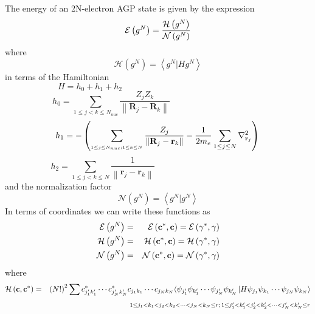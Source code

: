 \documentclass{article}
\begin{document}
The energy of an 2N-electron AGP state is given by the expression 
\begin{equation}
\mathcal{E}\left( g^{N}\right) =\frac{\mathcal{H}\left( g^{N}\right) }{%
\mathcal{N}\left( g^{N}\right) }  \label{Energy}
\end{equation}%
where%
\begin{equation*}
\mathcal{H}\left( g^{N}\right) =\left\langle g^{N}|Hg^{N}\right\rangle
\end{equation*}%
in terms of the Hamiltonian%
\begin{equation*}
H=h_{0}+h_{1}+h_{2}\qquad \qquad \qquad \qquad \qquad \qquad \qquad \qquad
\end{equation*}%
\begin{equation*}
h_{0}=\sum_{1\leq j<k\leq N_{nuc}}\frac{Z_{j}Z_{k}}{\left\| \mathbf{R}_{j}-%
\mathbf{R}_{k}\right\| }\qquad \qquad \qquad \qquad \qquad \quad
\end{equation*}%
\begin{equation*}
h_{1}=-\left( \sum_{_{1\leq j\leq N_{nuc};1\leq k\leq N}}\frac{Z_{j}}{%
\left\| \mathbf{R}_{j}-\mathbf{r}_{k}\right\| }-\frac{1}{2m_{e}}\sum_{1\leq
j\leq N}\nabla _{\mathbf{r}_{j}}^{2}\right) \,
\end{equation*}%
\begin{equation}
h_{2}=\sum_{1\leq j<k\leq N}\frac{1}{\left\| \mathbf{r}_{j}-\mathbf{r}%
_{k}\right\| }\qquad \qquad \qquad \qquad \qquad \qquad \quad
\end{equation}%
and the normalization factor 
\begin{equation}
\mathcal{N}\left( g^{N}\right) =\left\langle g^{N}|g^{N}\right\rangle
\end{equation}%
In terms of coordinates we can write these functions as 
\begin{eqnarray}
\mathcal{E}\left( g^{N}\right) &=&\mathcal{E}\left( \mathbf{c}^{\ast },%
\mathbf{c}\right) =\mathcal{E}\left( \mathbf{\gamma }^{\ast },\mathbf{\gamma 
}\right)  \notag \\
\mathcal{H}\left( g^{N}\right) &=&\mathcal{H}\left( \mathbf{c}^{\ast },%
\mathbf{c}\right) =\mathcal{H}\left( \mathbf{\gamma }^{\ast },\mathbf{\gamma 
}\right)  \notag \\
\mathcal{N}\left( g^{N}\right) &=&\mathcal{N}\left( \mathbf{c}^{\ast },%
\mathbf{c}\right) =\mathcal{N}\left( \mathbf{\gamma }^{\ast },\mathbf{\gamma 
}\right)  \label{EnFunc}
\end{eqnarray}%
where%
\begin{eqnarray}
\mathcal{H}\left( \mathbf{c},\mathbf{c}^{\ast }\right) &=&\left( N!\right)
^{2}\sum c_{j_{1}^{\prime }k_{1}^{\prime }}^{\ast }\cdots c_{j_{N}^{\prime
}k_{N}^{\prime }}^{\ast }c_{j_{1}k_{1}}\cdots c_{j_{N}k_{N}}\langle \psi
_{j_{1}^{\prime }}\psi _{k_{1}^{\prime }}\cdots \psi _{j_{N}^{\prime }}\psi
_{k_{N}^{\prime }}\left| H\psi _{j_{1}}\psi _{k_{1}}\cdots \psi _{j_{N}}\psi
_{k_{N}}\right\rangle  \notag \\
&&\qquad \qquad \qquad \qquad \quad _{1\leq j_{1}<k_{1}<j_{2}<k_{2}<\cdots
<j_{N}<k_{N}\leq r;\,1\leq j_{1}^{\prime }<k_{1}^{\prime }<j_{2}^{\prime
}<k_{2}^{\prime }<\cdots <j_{N}^{\prime }<k_{N}^{\prime }\leq r}
\end{eqnarray}%
\end{document}

